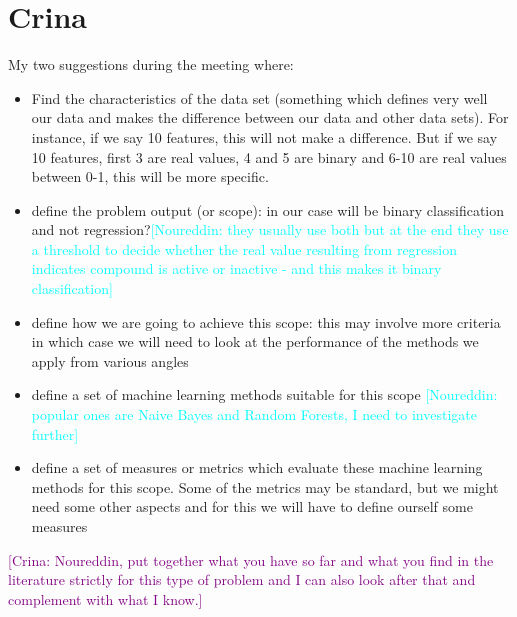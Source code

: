 \documentclass[a4paper,12pt, english]{article}
\newcommand{\kibitz}[2]{\ifnum\Comments=1\textcolor{#1}{#2}\fi}
\newcommand{\cg}[1]  {\kibitz{purple}   {[Crina: #1]}}
\newcommand{\ns}[1]{\kibitz{cyan}     {[Noureddin: #1]}}
\begin{document}
\section{Crina}
My two suggestions during the meeting where:
\begin{itemize}
\item Find the characteristics of the data set (something which defines very well our data and makes the difference between our data and other data sets). For instance, if we say 10 features, this will not make a difference. But if we say 10 features, first 3 are real values, 4 and 5 are binary and 6-10 are real values between 0-1, this will be more specific.
\item define the problem output (or scope): in our case will be binary classification and not regression?\ns{they usually use both but at the end they use a threshold to decide whether the real value resulting from regression indicates compound is active or inactive - and this makes it binary classification}
\item define how we are going to achieve this scope: this may involve more criteria in which case we will need to look at the performance of the methods we apply from various angles
\item define a set of machine learning methods suitable for this scope \ns{popular ones are Naive Bayes and Random Forests, I need to investigate further}
\item define a set of measures or metrics which evaluate these machine learning methods for this scope. Some of the metrics may be standard, but we might need some other aspects and for this we will have to define ourself some measures
\end{itemize}

\cg{Noureddin, put together what you have so far and what you find in the literature strictly for this type of problem  and I can also look after that and complement with what I know.}
		
\end{document}
